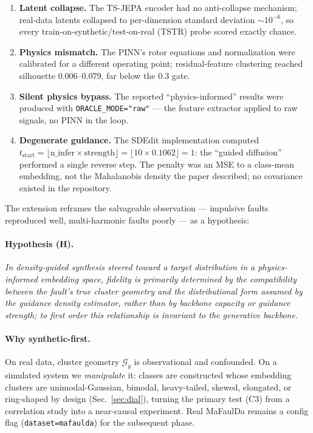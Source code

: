 \documentclass[11pt]{article}
\newcommand{\Gng}{\mathcal{G}}
\newcommand{\code}[1]{\texttt{\small #1}}
\begin{document}
\begin{enumerate}[leftmargin=1.6em,itemsep=1pt]
\item \textbf{Latent collapse.} The TS-JEPA encoder had no anti-collapse
mechanism; real-data latents collapsed to per-dimension standard deviation
$\sim\!10^{-6}$, so every train-on-synthetic/test-on-real (TSTR) probe scored
exactly chance.
\item \textbf{Physics mismatch.} The PINN's rotor equations and normalization
were calibrated for a different operating point; residual-feature clustering
reached silhouette $0.006$--$0.079$, far below the $0.3$ gate.
\item \textbf{Silent physics bypass.} The reported ``physics-informed''
results were produced with \code{ORACLE\_MODE="raw"} --- the feature extractor
applied to raw signals, no PINN in the loop.
\item \textbf{Degenerate guidance.} The SDEdit implementation computed
$t_{\mathrm{start}} = \lfloor \text{n\_infer} \times \text{strength} \rfloor
= \lfloor 10 \times 0.1062\rfloor = 1$: the ``guided diffusion'' performed a
single reverse step. The penalty was an MSE to a class-mean embedding, not
the Mahalanobis density the paper described; no covariance existed in the
repository.
\end{enumerate}

The extension reframes the salvageable observation --- impulsive faults
reproduced well, multi-harmonic faults poorly --- as a hypothesis:

\paragraph{Hypothesis (H).} \emph{In density-guided synthesis steered toward
a target distribution in a physics-informed embedding space, fidelity is
primarily determined by the compatibility between the fault's true cluster
geometry and the distributional form assumed by the guidance density
estimator, rather than by backbone capacity or guidance strength; to first
order this relationship is invariant to the generative backbone.}

\paragraph{Why synthetic-first.} On real data, cluster geometry $\Gng_y$ is
observational and confounded. On a simulated system we \emph{manipulate} it:
classes are constructed whose embedding clusters are unimodal-Gaussian,
bimodal, heavy-tailed, skewed, elongated, or ring-shaped by design
(Sec.~\ref{sec:dial}), turning the primary test (C3) from a correlation
study into a near-causal experiment. Real MaFaulDa remains a config flag
(\code{dataset=mafaulda}) for the subsequent phase.
\end{document}
